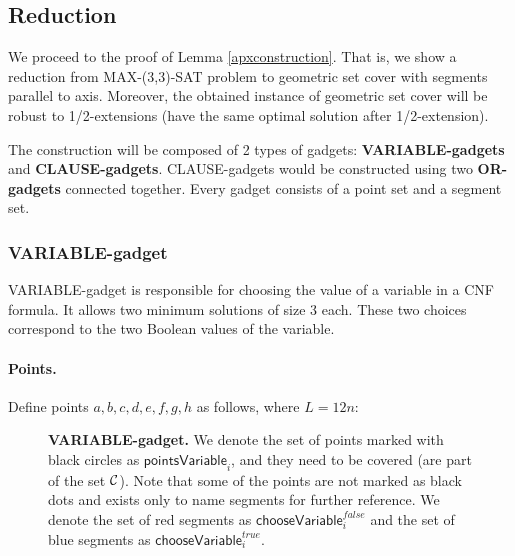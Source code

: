 \subsection{Reduction}
\label{construction_description}
We proceed to the proof of Lemma \ref{apxconstruction}.
That is, we show a reduction from MAX-(3,3)-SAT problem
to geometric set cover with segments
parallel to axis. Moreover, the obtained instance
of geometric set cover will be robust
to 1/2-extensions (have the same optimal solution
after 1/2-extension).

The construction will be composed of 2 types of gadgets:
\textbf{VARIABLE-gadgets} and \textbf{CLAUSE-gadgets}.
CLAUSE-gadgets would be constructed using two \textbf{OR-gadgets}
connected together.
Every gadget consists of a point set and a segment set.


\subsubsection{VARIABLE-gadget}

VARIABLE-gadget is responsible for choosing the value of a variable
in a CNF formula. It allows two minimum solutions of size 3 each.
These two choices correspond to the two Boolean values of the variable.

\paragraph{Points.}

Define points $a,b,c,d,e,f,g,h$ as follows, where $L = 12n$:


\newcommand{\pointsVarNoArg}{\mathsf{pointsVariable} }
\newcommand{\pointsVar}[1]{\mathsf{pointsVariable}_{#1} }
\newcommand{\chooseVar}[2]{\mathsf{chooseVariable}^{#1}_{#2} }
\newcommand{\segmentsVar}[1]{\mathsf{segmentsVariable}_{#1} }

\begin{figure}[h]
\centering
\def\svgwidth{0.5\columnwidth}

\caption{\textbf{VARIABLE-gadget.}
We denote the set of points marked with black circles as $\pointsVar{i}$,
and they need to be covered (are part of the set $\mathcal{C}$).
Note that some of the points are not marked as black dots
and exists only to name segments for further reference.
We denote the set of red segments as $\chooseVar{false}{i}$
and the set of blue segments as $\chooseVar{true}{i}$.}
\label{fig:apx_choose_variable}
\end{figure}

